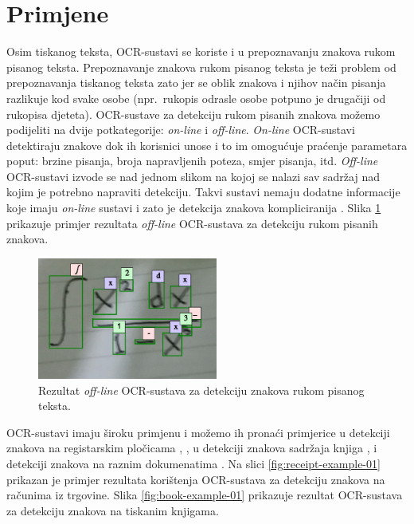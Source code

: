 \documentclass[times, utf8, zavrsni]{fer}
\begin{document}
\section{Primjene}

Osim tiskanog teksta, OCR-sustavi se koriste i u prepoznavanju znakova rukom pisanog teksta.
Prepoznavanje znakova rukom pisanog teksta je teži problem od prepoznavanja tiskanog teksta \citep{DBLP:journals/corr/abs-1710-05703} zato jer
se oblik znakova i njihov način pisanja razlikuje kod svake osobe (npr.\
rukopis odrasle osobe potpuno je drugačiji od rukopisa djeteta).
OCR-sustave za detekciju rukom pisanih znakova možemo podijeliti na dvije potkategorije:
\emph{on-line} i \emph{off-line}. \emph{On-line} OCR-sustavi detektiraju znakove dok
ih korisnici unose i to im omogućuje praćenje parametara poput: brzine pisanja, broja napravljenih poteza,
smjer pisanja, itd. \emph{Off-line} OCR-sustavi izvode se nad jednom slikom na kojoj se nalazi
sav sadržaj nad kojim je potrebno napraviti detekciju. Takvi sustavi nemaju dodatne informacije koje imaju
\emph{on-line} sustavi i zato je detekcija znakova kompliciranija \citep{DBLP:journals/corr/abs-1710-05703}. Slika \ref{fig:math-example-01} prikazuje primjer rezultata
\emph{off-line} OCR-sustava za detekciju rukom pisanih znakova.

\begin{figure}[htb]
    \centering
    \captionsetup{justification=centering,margin=2cm}
    \includegraphics[height=4cm]{images/math-example-01.png}
    \caption{Rezultat \emph{off-line} OCR-sustava za detekciju znakova rukom pisanog teksta.}
    \label{fig:math-example-01}
\end{figure}

\pagebreak

OCR-sustavi imaju široku primjenu i možemo ih pronaći primjerice u detekciji
znakova na registarskim pločicama \citep{DBLP:journals/corr/Saghaei16a}, \citep{DBLP:journals/corr/abs-1802-09567},
u detekciji znakova sadržaja knjiga \citep{DBLP:journals/corr/abs-1802-10033},
\citep{Christy:2017:MDE:3172938.3075645} i
detekciji znakova na raznim dokumenatima \citep{DBLP:journals/corr/HarrajR15} \citep{verma2016ocr}. Na slici \ref{fig:receipt-example-01}
prikazan je primjer rezultata korištenja OCR-sustava za detekciju znakova na računima iz trgovine.
Slika \ref{fig:book-example-01} prikazuje rezultat OCR-sustava za detekciju znakova na tiskanim knjigama.
\end{document}
